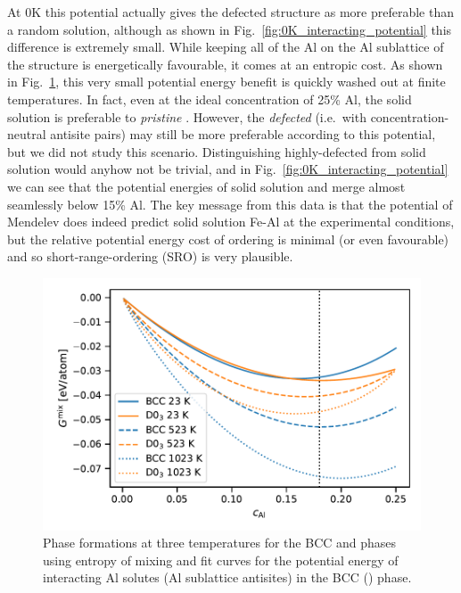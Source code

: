 At 0K this potential actually gives the defected \DOTHREE structure as more preferable than a random solution, although as shown in Fig.~\ref{fig:0K_interacting_potential} this difference is extremely small.
While keeping all of the Al on the Al sublattice of the \DOTHREE structure is energetically favourable, it comes at an entropic cost.
As shown in Fig.~\ref{fig:0K_interacting_mixing}, this very small potential energy benefit is quickly washed out at finite temperatures.
In fact, even at the ideal \DOTHREE concentration of 25\% Al, the solid solution is preferable to \emph{pristine} \DOTHREE.
However, the \emph{defected} \DOTHREE (i.e.~with concentration-neutral antisite pairs) may still be more preferable according to this potential, but we did not study this scenario.
Distinguishing highly-defected \DOTHREE from solid solution would anyhow not be trivial, and in Fig.~\ref{fig:0K_interacting_potential} we can see that the potential energies of solid solution and \DOTHREE merge almost seamlessly below 15\% Al.
The key message from this data is that the potential of Mendelev \etal does indeed predict solid solution Fe-Al at the experimental conditions, but the relative potential energy cost of \DOTHREE ordering is minimal (or even favourable) and so short-range-ordering (SRO) is very plausible.
%
\begin{figure}[h]
    \label{fig:0K_interacting_mixing}
    \centering
    \includegraphics[width=\textwidth]{figures/zerok_interacting_defect_mixing}
    \caption{Phase formations at three temperatures for the BCC and \DOTHREE phases using entropy of mixing and fit curves for the potential energy of interacting Al solutes (Al sublattice antisites) in the BCC (\DOTHREE) phase.}
\end{figure}
%

